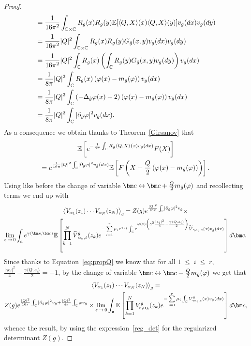 \documentclass[10pt]{amsart}
\theoremstyle{definition}\newtheorem{defi}[theo]{Definition}\newtheorem{rema}[theo]{Remark}\newtheorem{exam}[theo]{Example}\newtheorem{exem}[theo]{Example}\newtheorem{nota}[theo]{Notation}
\renewcommand{\tilde}{\widetilde}
\renewcommand{\leq}{\;\leqslant\;}
\newcommand{\frka}{\mathfrak{a}}
\newcommand{\C}{\mathbb{C}}
\newcommand{\E}{\mathbb{E}}
\newcommand{\ps}[1]{\langle #1 \rangle}
\newcommand*\eps{\varepsilon}
\newcommand{\expect}[1]{\mathbb{E}\left[#1\right]}
\let\oldtilde\tilde
\renewcommand*{\tilde}[1]{\mathchoice{\widetilde{#1}}{\widetilde{#1}}{\oldtilde{#1}}{\oldtilde{#1}}}
\let\oldhat\hat
\renewcommand*{\hat}[1]{\mathchoice{\widehat{#1}}{\widehat{#1}}{\oldhat{#1}}{\oldhat{#1}}}
\begin{document}
\begin{proof}
\begin{align*}
& = \frac{1}{16\pi^2} \int_{\C \times \C} R_g(x) R_g(y) \E[\langle Q, X \rangle (x) \langle Q, X \rangle (y)] v_g(dx)v_g(dy) \\
& = \frac{1}{16\pi^2}|Q|^2 \int_{\C \times \C} R_g(x) R_g(y) G_{\hat g}(x,y) v_g(dx)v_g(dy) \\
& = \frac{1}{16\pi^2} |Q|^2 \int_{\C } R_g(x) \left (\int_{\C} R_g(y) G_{\hat g}(x,y)v_g(dy) \right) v_g(dx) \\
& = \frac{1}{8\pi}|Q|^2 \int_{\C } R_g(x) \left(\varphi(x) -m_{\hat g}(\varphi)\right) v_g(dx) \\
& = \frac{1}{8\pi}|Q|^2 \int_{\C } \left(-\Delta_{\hat g} \varphi(x)+2\right) \left(\varphi(x) -m_{\hat g}(\varphi)\right) v_{\hat g}(dx) \\
& = \frac{1}{8\pi} |Q|^2 \int_{\C } |\partial_{\hat{g}} \varphi|^2 v_{\hat{g}}(dx).
\end{align*}
As a consequence we obtain thanks to Theorem~\ref{Girsanov} that
\begin{multline*}
\expect{e^{-\frac{1}{4 \pi} \int_{\C} R_g \langle Q, X \rangle (x) v_g(dx)}F(X)}\\
=e^{\frac{1}{16\pi} |Q|^2 \int_{\C } \left|\partial_{\hat{g}} \varphi\right|^2 v_{\hat{g}}(dx)}\expect{F\left(X+\frac{Q}{2}\left(\varphi(x) -m_{\hat g}(\varphi)\right)\right)}.
\end{multline*}
Using like before the change of variable $\bm c\leftrightarrow\bm c +\frac Q2m_{\hat g}(\varphi)$ and recollecting terms we end up with
\begin{multline*}
\big\langle V_{\alpha_1}(z_1) \cdots V_{\alpha_N}(z_N) \big\rangle _g= Z(g)e^{ \frac{|Q|^2}{16 \pi} \int_{\C } \left|\partial_{\hat{g}} \varphi\right|^2 v_{\hat{g}} } \times\\
\underset{\eps\,\to\,0}{\lim}\int_{\frka} e^{\gamma\ps{\bm s,\bm c}} \E \left [\prod_{k=1}^N \tilde V^{\hat g}_{\alpha_k,\eps}(z_k) e^{ - \sum\limits_{i=1}^{r} \mu_i e^{\gamma c_i} \int_{\C} e^{ \varphi(x) \left(\gamma^2 \frac{|e_i|^2}{4}-\frac{\gamma \langle Q,e_i \rangle }{2}\right) } \tilde V_{\gamma e_i,\eps}(x) v_g(dx) } \right] d\bm c.
\end{multline*}
Since thanks to Equation~\eqref{eq:propQ} we know that for all $1\leq i\leq r$, $\frac{|\gamma e_i|^2}{4}-\frac{\gamma \langle Q,e_i \rangle }{2}=-1$, by the change of variable ${\bm c \leftrightarrow \bm c- \frac{Q}2 m_{\hat g}(\varphi)}$ we get that
\begin{multline*}
\left\langle V_{\alpha_1}(z_1) \cdots V_{\alpha_N}(z_N) \right\rangle _g = \\
Z(g) e^{ \frac{|Q|^2}{16 \pi} \int_{\C } |\partial_{\hat{g}} \varphi|^2 v_{\hat{g}} + \frac{|Q|^2}{4 \pi} \int_{\C } \varphi v_{\hat{g}} } \times \underset{\eps\,\to\,0}{\lim}\int_{\frka} \E \left[\prod_{k=1}^N V^{\hat g}_{\eps, \alpha_k}(z_k) e^{ -\sum\limits_{i=1}^r \mu_i \int_{\C} V^{\hat g}_{\gamma e_i,\eps}(x) v_{\hat{g}}(dx) }\right]d\bm c,
\end{multline*}
whence the result, by using the expression~\eqref{reg_det} for the regularized determinant $Z(g)$.


\end{proof}
\end{document}
